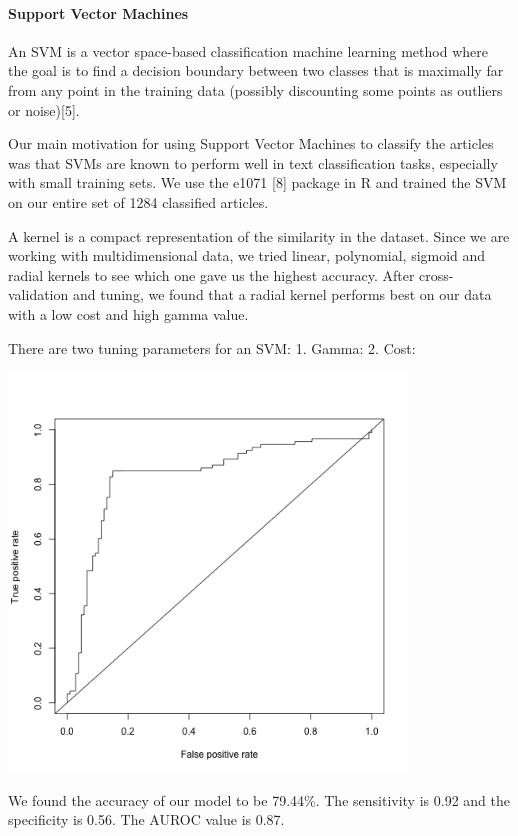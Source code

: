 \documentclass[10pt,letterpaper]{article}
\begin{document}
\hypertarget{support-vector-machines}{%
\paragraph{Support Vector Machines}\label{support-vector-machines}}

An SVM is a vector space-based classification machine learning method
where the goal is to find a decision boundary between two classes that
is maximally far from any point in the training data (possibly
discounting some points as outliers or noise){[}5{]}.

Our main motivation for using Support Vector Machines to classify the
articles was that SVMs are known to perform well in text classification
tasks, especially with small training sets. We use the e1071 {[}8{]}
package in R and trained the SVM on our entire set of 1284 classified
articles.

A kernel is a compact representation of the similarity in the dataset.
Since we are working with multidimensional data, we tried linear,
polynomial, sigmoid and radial kernels to see which one gave us the
highest accuracy. After cross-validation and tuning, we found that a
radial kernel performs best on our data with a low cost and high gamma
value.

There are two tuning parameters for an SVM: 1. Gamma: 2. Cost:

\includegraphics[width=400px]{roc-curve}

We found the accuracy of our model to be 79.44\%. The sensitivity is
0.92 and the specificity is 0.56. The AUROC value is 0.87.
\end{document}
